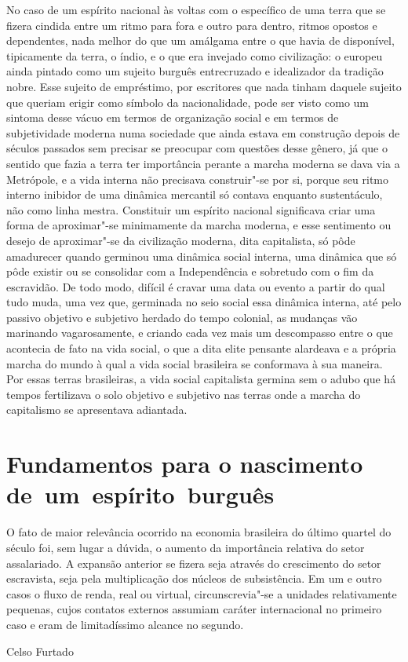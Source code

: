 {No caso de um espírito nacional às voltas com o específico de uma terra
que se fizera cindida entre um ritmo para fora e outro para dentro,
ritmos opostos e dependentes, nada melhor do que um amálgama entre o que
havia de disponível, tipicamente da terra, o índio, e o que era invejado
como civilização: o europeu ainda pintado como um sujeito burguês
entrecruzado e idealizador da tradição nobre. Esse sujeito de
empréstimo, por escritores que nada tinham daquele sujeito que queriam
erigir como símbolo da nacionalidade, pode ser visto como um sintoma
desse vácuo em termos de organização social e em termos de subjetividade
moderna numa sociedade que ainda estava em construção depois de séculos
passados sem precisar se preocupar com questões desse gênero, já que o
sentido que fazia a terra ter importância perante a marcha moderna se
dava via a Metrópole, e a vida interna não precisava construir"-se por
si, porque seu ritmo interno inibidor de uma dinâmica mercantil só
contava enquanto sustentáculo, não como linha mestra. Constituir um
espírito nacional significava criar uma forma de aproximar"-se
minimamente da marcha moderna, e esse sentimento ou desejo de
aproximar"-se da civilização moderna, dita capitalista, só pôde
amadurecer quando germinou uma dinâmica social interna, uma dinâmica que
só pôde existir ou se consolidar com a Independência e sobretudo com o
fim da escravidão. De todo modo, difícil é cravar uma data ou evento a
partir do qual tudo muda, uma vez que, germinada no seio social essa
dinâmica interna, até pelo passivo objetivo e subjetivo herdado do tempo
colonial, as mudanças vão marinando vagarosamente, e criando cada vez
mais um descompasso entre o que acontecia de fato na vida social, o que
a dita elite pensante alardeava e a própria marcha do mundo à qual a
vida social brasileira se conformava à sua maneira. Por essas terras
brasileiras, a vida social capitalista germina sem o adubo que há tempos
fertilizava o solo objetivo e subjetivo nas terras onde a marcha do
capitalismo se apresentava adiantada.

\section{Fundamentos para o nascimento de~um~espírito~burguês}

\epigraph{O fato de maior relevância ocorrido na economia brasileira do último
quartel do século  foi, sem lugar a dúvida, o aumento da importância
relativa do setor assalariado. A expansão anterior se fizera seja
através do crescimento do setor escravista, seja pela multiplicação dos
núcleos de subsistência. Em um e outro casos o fluxo de renda, real ou
virtual, circunscrevia"-se a unidades relativamente pequenas, cujos
contatos externos assumiam caráter internacional no primeiro caso e eram
de limitadíssimo alcance no segundo.}{Celso Furtado}


}
